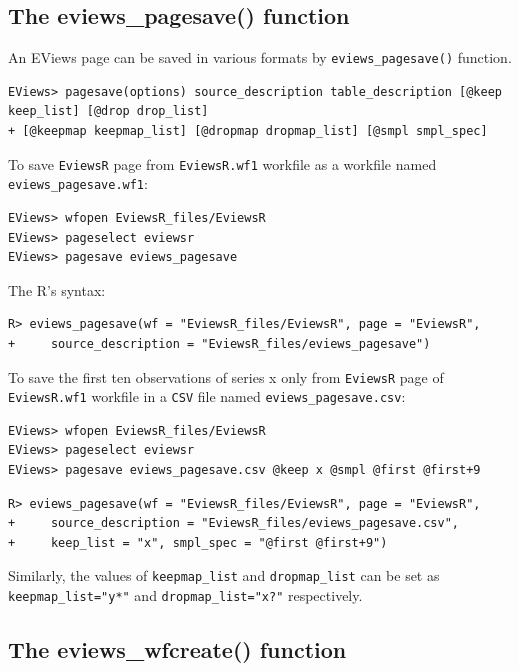 \hypertarget{the-eviews_pagesave-function}{%
\subsection{The eviews\_pagesave() function}\label{the-eviews_pagesave-function}}

An EViews page can be saved in various formats by \texttt{eviews\_pagesave()} function.

\begin{verbatim}
EViews> pagesave(options) source_description table_description [@keep keep_list] [@drop drop_list]
+ [@keepmap keepmap_list] [@dropmap dropmap_list] [@smpl smpl_spec]
\end{verbatim}

To save \texttt{EviewsR} page from \texttt{EviewsR.wf1} workfile as a workfile named \texttt{eviews\_pagesave.wf1}:

\begin{verbatim}
EViews> wfopen EviewsR_files/EviewsR
EViews> pageselect eviewsr
EViews> pagesave eviews_pagesave
\end{verbatim}

The R's syntax:

\begin{verbatim}
R> eviews_pagesave(wf = "EviewsR_files/EviewsR", page = "EviewsR",
+     source_description = "EviewsR_files/eviews_pagesave")
\end{verbatim}

To save the first ten observations of series x only from \texttt{EviewsR} page of \texttt{EviewsR.wf1} workfile in a \texttt{CSV} file named \texttt{eviews\_pagesave.csv}:

\begin{verbatim}
EViews> wfopen EviewsR_files/EviewsR
EViews> pageselect eviewsr
EViews> pagesave eviews_pagesave.csv @keep x @smpl @first @first+9
\end{verbatim}

\begin{verbatim}
R> eviews_pagesave(wf = "EviewsR_files/EviewsR", page = "EviewsR",
+     source_description = "EviewsR_files/eviews_pagesave.csv",
+     keep_list = "x", smpl_spec = "@first @first+9")
\end{verbatim}

Similarly, the values of \texttt{keepmap\_list} and \texttt{dropmap\_list} can be set as \texttt{keepmap\_list="y*"} and \texttt{dropmap\_list="x?"} respectively.

\hypertarget{the-eviews_wfcreate-function}{%
\subsection{The eviews\_wfcreate() function}\label{the-eviews_wfcreate-function}}

